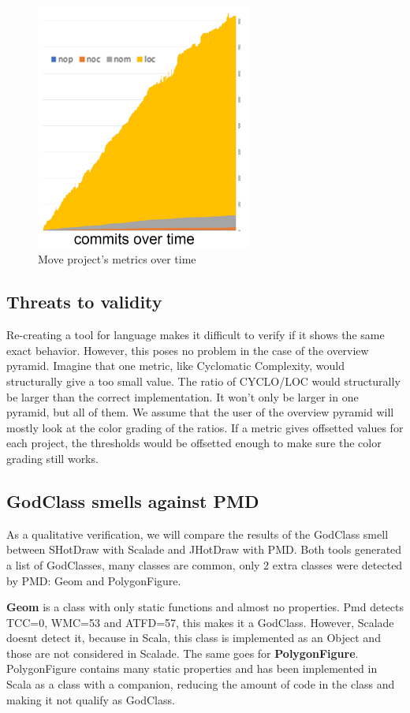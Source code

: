 \documentclass[onecolumn]{article}
\begin{document}
\begin{figure}[H]
    \centering
    \includegraphics[width=200pt]{fig/graph_move.PNG}
    \caption{Move project's metrics over time}
    \label{fig:graph_move}
\end{figure}


\subsection{Threats to validity}
Re-creating a tool for language makes it difficult to verify if it shows the same exact behavior. However, this poses no problem in the case of the overview pyramid. 
Imagine that one metric, like Cyclomatic Complexity, would structurally give a too small value. The ratio of CYCLO/LOC would structurally be larger than the correct implementation. It won't only be larger in one pyramid, but all of them. We assume that the user of the overview pyramid will mostly look at the color grading of the ratios. If a metric gives offsetted values for each project, the thresholds would be offsetted enough to make sure the color grading still works.


\subsection{GodClass smells against PMD}
As a qualitative verification, we will compare the results of the GodClass smell between SHotDraw with Scalade and JHotDraw with PMD. Both tools generated a list of GodClasses, many classes are common, only 2 extra classes were detected by PMD: Geom and PolygonFigure. 

\textbf{Geom} is a class with only static functions and almost no properties. Pmd detects TCC=0, WMC=53 and ATFD=57, this makes it a GodClass. However, Scalade doesnt detect it, because in Scala, this class is implemented as an Object and those are not considered in Scalade. The same goes for \textbf{PolygonFigure}. PolygonFigure contains many static properties and has been implemented in Scala as a class with a companion, reducing the amount of code in the class and making it not qualify as GodClass.
\end{document}
